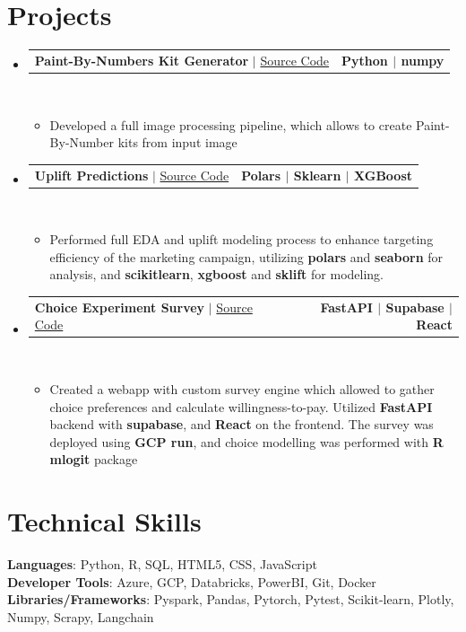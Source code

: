 \documentclass[letterpaper,11pt]{article}
\makeatletter
\newcommand{\resumeItem}[1]{
  \item\small{
    {#1 \vspace{0pt}}
  }
}
\newcommand{\resumeProjectHeading}[2]{
    \item
    \begin{tabular*}{1.001\textwidth}{l@{\extracolsep{\fill}}r}
      \small#1 & \textbf{\small #2}\\
    \end{tabular*}\vspace{-7pt}
}
\newcommand{\resumeSubHeadingListStart}{\begin{itemize}[leftmargin=0.0in, label={}]}
\newcommand{\resumeSubHeadingListEnd}{\end{itemize}}\vspace{0pt}
\newcommand{\resumeItemListStart}{\begin{itemize}}
\newcommand{\resumeItemListEnd}{\end{itemize}\vspace{-5pt}}
\makeatother
\begin{document}
\section{Projects} 
    \vspace{-5pt}
    \resumeSubHeadingListStart
    \resumeProjectHeading
            {\textbf{{Paint-By-Numbers Kit Generator}} $|$ \href{https://github.com/kasztelmacko/willsee}{Source Code}}{Python $|$ numpy }
            \\[5mm]
          \resumeItemListStart
            \resumeItem{Developed a full image processing pipeline, which allows to create Paint-By-Number kits from input image}
          \resumeItemListEnd
 \vspace{-20pt}
 \resumeProjectHeading
            {\textbf{{Uplift Predictions}} $|$ {\href{https://github.com/kasztelmacko/uplift_ml}{Source Code}}}{Polars $|$ Sklearn $|$ XGBoost}
            \\[5mm]
          \resumeItemListStart
            \resumeItem{Performed full EDA and uplift modeling process to enhance targeting efficiency of the marketing campaign, utilizing \textbf{polars} and \textbf{seaborn} for analysis, and \textbf{scikitlearn}, \textbf{xgboost} and \textbf{sklift} for modeling.}
          \resumeItemListEnd
 \vspace{-17pt}
 \resumeProjectHeading
            {\textbf{{Choice Experiment Survey}} $|$ {\href{https://github.com/kasztelmacko/master-survey}{Source Code}}}{FastAPI $|$ Supabase $|$ React}
            \\[5mm]
        \resumeItemListStart
            \resumeItem{Created a webapp with custom survey engine which allowed to gather choice preferences and calculate willingness-to-pay. Utilized \textbf{FastAPI} backend with \textbf{supabase}, and \textbf{React} on the frontend. The survey was deployed using \textbf{GCP run}, and choice modelling was performed with \textbf{R mlogit} package}
        \resumeItemListEnd

\resumeSubHeadingListEnd
\vspace{-20pt}
\section{Technical Skills}
 \begin{itemize}[leftmargin=0.15in, label={}]
    \small{\item{   
     \textbf{Languages}{: Python, R, SQL, HTML5, CSS, JavaScript} \\[1mm]
     \textbf{Developer Tools}{: Azure, GCP, Databricks, PowerBI, Git, Docker} \\[1mm]
     \textbf{Libraries/Frameworks}{: Pyspark, Pandas, Pytorch, Pytest, Scikit-learn, Plotly, Numpy, Scrapy, Langchain} \\ [1mm]
    }}
 \end{itemize}
 \vspace{-16pt}
 \vspace{3pt}
\vspace{10pt}

\vspace{-15pt}
\end{document}

